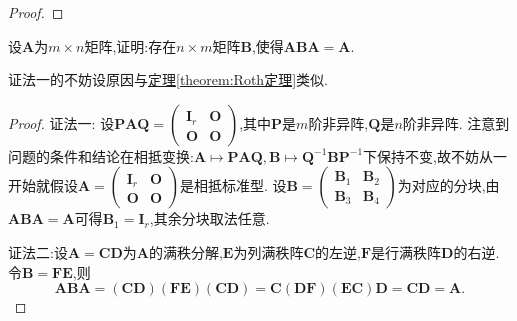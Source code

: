 \documentclass[../../main.tex]{subfiles}
\begin{document}
\begin{proof}


\end{proof}

\begin{example}\label{example:3.26111}
设\(\boldsymbol{A}\)为\(m\times n\)矩阵,证明:存在\(n\times m\)矩阵\(\boldsymbol{B}\),使得\(\boldsymbol{A}\boldsymbol{B}\boldsymbol{A}=\boldsymbol{A}\).
\end{example}
\begin{note}
{\color{blue}证法一}的不妨设原因与\hyperref[theorem:Roth定理]{定理\ref{theorem:Roth定理}}类似.
\end{note}
\begin{proof}
{\color{blue}证法一:}
设\(\boldsymbol{P}\boldsymbol{A}\boldsymbol{Q}=\begin{pmatrix}
\boldsymbol{I}_r&\boldsymbol{O}\\
\boldsymbol{O}&\boldsymbol{O}
\end{pmatrix}\),其中\(\boldsymbol{P}\)是\(m\)阶非异阵,\(\boldsymbol{Q}\)是\(n\)阶非异阵. 注意到问题的条件和结论在相抵变换:\(\boldsymbol{A}\mapsto\boldsymbol{P}\boldsymbol{A}\boldsymbol{Q},\boldsymbol{B}\mapsto\boldsymbol{Q}^{-1}\boldsymbol{B}\boldsymbol{P}^{-1}\)下保持不变,故不妨从一开始就假设\(\boldsymbol{A}=\begin{pmatrix}
\boldsymbol{I}_r&\boldsymbol{O}\\
\boldsymbol{O}&\boldsymbol{O}
\end{pmatrix}\)是相抵标准型. 设\(\boldsymbol{B}=\begin{pmatrix}
\boldsymbol{B}_1&\boldsymbol{B}_2\\
\boldsymbol{B}_3&\boldsymbol{B}_4
\end{pmatrix}\)为对应的分块,由\(\boldsymbol{A}\boldsymbol{B}\boldsymbol{A}=\boldsymbol{A}\)可得\(\boldsymbol{B}_1=\boldsymbol{I}_r\),其余分块取法任意.

{\color{blue}证法二:}设\(\boldsymbol{A}=\boldsymbol{C}\boldsymbol{D}\)为\(\boldsymbol{A}\)的满秩分解,\(\boldsymbol{E}\)为列满秩阵\(\boldsymbol{C}\)的左逆,\(\boldsymbol{F}\)是行满秩阵\(\boldsymbol{D}\)的右逆. 令\(\boldsymbol{B}=\boldsymbol{F}\boldsymbol{E}\),则
\[
\boldsymbol{A}\boldsymbol{B}\boldsymbol{A}=(\boldsymbol{C}\boldsymbol{D})(\boldsymbol{F}\boldsymbol{E})(\boldsymbol{C}\boldsymbol{D})=\boldsymbol{C}(\boldsymbol{D}\boldsymbol{F})(\boldsymbol{E}\boldsymbol{C})\boldsymbol{D}=\boldsymbol{C}\boldsymbol{D}=\boldsymbol{A}.
\]

\end{proof}
\end{document}
